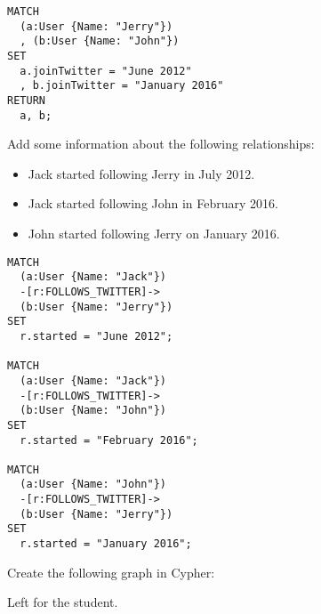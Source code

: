 \documentclass[a4paper,12pt]{exam}
\begin{document}
\begin{questions}
\begin{solution}
\begin{verbatim}
MATCH
  (a:User {Name: "Jerry"})
  , (b:User {Name: "John"})
SET
  a.joinTwitter = "June 2012"
  , b.joinTwitter = "January 2016"
RETURN
  a, b;
  \end{verbatim}
\end{solution}

\question
Add some information about the following relationships:
\begin{itemize}
  \item Jack started following Jerry in July 2012.
  \item Jack started following John in February 2016.
  \item John started following Jerry on January 2016.
\end{itemize}

\begin{solution}
  \begin{verbatim}
MATCH
  (a:User {Name: "Jack"})
  -[r:FOLLOWS_TWITTER]->
  (b:User {Name: "Jerry"})
SET
  r.started = "June 2012";
	
MATCH
  (a:User {Name: "Jack"})
  -[r:FOLLOWS_TWITTER]->
  (b:User {Name: "John"})
SET
  r.started = "February 2016";
	
MATCH
  (a:User {Name: "John"})
  -[r:FOLLOWS_TWITTER]->
  (b:User {Name: "Jerry"})
SET
  r.started = "January 2016";
  \end{verbatim}
\end{solution}

\question
  Create the following graph in Cypher:
  \begin{center}
  \end{center}
\begin{solution}
Left for the student.
\end{solution}



\end{questions}
\end{document}
